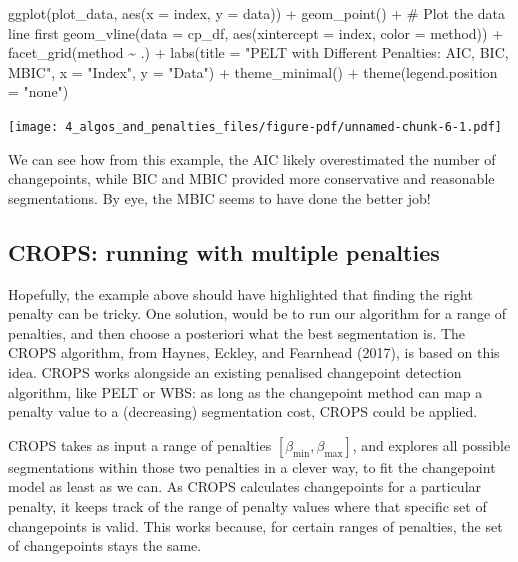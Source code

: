 \documentclass[
  letterpaper,
  DIV=11,
  numbers=noendperiod]{scrreprt}
\newenvironment{Shaded}{\begin{snugshade}}{\end{snugshade}}
\newcommand{\AttributeTok}[1]{\textcolor[rgb]{0.40,0.45,0.13}{#1}}
\newcommand{\CommentTok}[1]{\textcolor[rgb]{0.37,0.37,0.37}{#1}}
\newcommand{\FunctionTok}[1]{\textcolor[rgb]{0.28,0.35,0.67}{#1}}
\newcommand{\NormalTok}[1]{\textcolor[rgb]{0.00,0.23,0.31}{#1}}
\newcommand{\SpecialCharTok}[1]{\textcolor[rgb]{0.37,0.37,0.37}{#1}}
\newcommand{\StringTok}[1]{\textcolor[rgb]{0.13,0.47,0.30}{#1}}
\begin{document}
\begin{Shaded}
\begin{Highlighting}[]
\FunctionTok{ggplot}\NormalTok{(plot\_data, }\FunctionTok{aes}\NormalTok{(}\AttributeTok{x =}\NormalTok{ index, }\AttributeTok{y =}\NormalTok{ data)) }\SpecialCharTok{+}
  \FunctionTok{geom\_point}\NormalTok{() }\SpecialCharTok{+}  \CommentTok{\# Plot the data line first}
  \FunctionTok{geom\_vline}\NormalTok{(}\AttributeTok{data =}\NormalTok{ cp\_df, }\FunctionTok{aes}\NormalTok{(}\AttributeTok{xintercept =}\NormalTok{ index, }\AttributeTok{color =}\NormalTok{ method)) }\SpecialCharTok{+}
  \FunctionTok{facet\_grid}\NormalTok{(method }\SpecialCharTok{\textasciitilde{}}\NormalTok{ .) }\SpecialCharTok{+}
  \FunctionTok{labs}\NormalTok{(}\AttributeTok{title =} \StringTok{"PELT with Different Penalties: AIC, BIC, MBIC"}\NormalTok{, }\AttributeTok{x =} \StringTok{"Index"}\NormalTok{, }\AttributeTok{y =} \StringTok{"Data"}\NormalTok{) }\SpecialCharTok{+}
  \FunctionTok{theme\_minimal}\NormalTok{() }\SpecialCharTok{+}
  \FunctionTok{theme}\NormalTok{(}\AttributeTok{legend.position =} \StringTok{"none"}\NormalTok{)}
\end{Highlighting}
\end{Shaded}

\texttt{[image: 4\_algos\_and\_penalties\_files/figure-pdf/unnamed-chunk-6-1.pdf]}

We can see how from this example, the AIC likely overestimated the
number of changepoints, while BIC and MBIC provided more conservative
and reasonable segmentations. By eye, the MBIC seems to have done the
better job!

\subsection{CROPS: running with multiple
penalties}\label{crops-running-with-multiple-penalties}

Hopefully, the example above should have highlighted that finding the
right penalty can be tricky. One solution, would be to run our algorithm
for a range of penalties, and then choose a posteriori what the best
segmentation is. The CROPS algorithm, from Haynes, Eckley, and Fearnhead
(2017), is based on this idea. CROPS works alongside an existing
penalised changepoint detection algorithm, like PELT or WBS: as long as
the changepoint method can map a penalty value to a (decreasing)
segmentation cost, CROPS could be applied.

CROPS takes as input a range of penalties
\([\beta_{\text{min}}, \beta_{\text{max}}]\), and explores all possible
segmentations within those two penalties in a clever way, to fit the
changepoint model as least as we can. As CROPS calculates changepoints
for a particular penalty, it keeps track of the range of penalty values
where that specific set of changepoints is valid. This works because,
for certain ranges of penalties, the set of changepoints stays the same.
\end{document}
